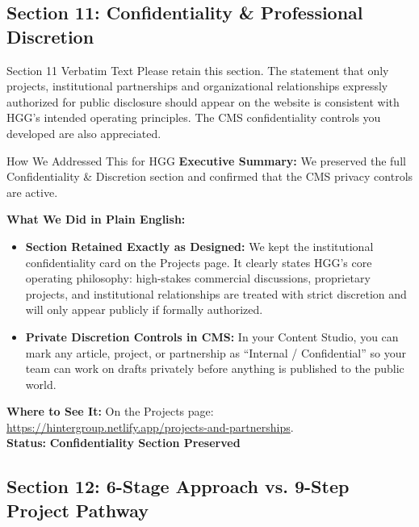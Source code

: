 \documentclass[11pt,a4paper]{article}
\begin{document}
\vspace{0.3cm}

\subsection{Section 11: Confidentiality \& Professional Discretion}

\begin{VerbatimClientBox}{Section 11 Verbatim Text}
Please retain this section.
The statement that only projects, institutional partnerships and organizational relationships expressly authorized for public disclosure should appear on the website is consistent with HGG's intended operating principles.
The CMS confidentiality controls you developed are also appreciated.
\end{VerbatimClientBox}

\begin{DetailedResolutionBox}{How We Addressed This for HGG}
\textbf{Executive Summary:} We preserved the full Confidentiality \& Discretion section and confirmed that the CMS privacy controls are active.

\textbf{What We Did in Plain English:}
\begin{itemize}
    \item \textbf{Section Retained Exactly as Designed:} We kept the institutional confidentiality card on the Projects page. It clearly states HGG's core operating philosophy: high-stakes commercial discussions, proprietary projects, and institutional relationships are treated with strict discretion and will only appear publicly if formally authorized.
    \item \textbf{Private Discretion Controls in CMS:} In your Content Studio, you can mark any article, project, or partnership as ``Internal / Confidential'' so your team can work on drafts privately before anything is published to the public world.
\end{itemize}

\textbf{Where to See It:} On the Projects page: \url{https://hintergroup.netlify.app/projects-and-partnerships}. \\
\textbf{Status:} \textcolor{HGGGreen}{\textbf{Confidentiality Section Preserved}}
\end{DetailedResolutionBox}

\vspace{0.3cm}

\subsection{Section 12: 6-Stage Approach vs. 9-Step Project Pathway}
\end{document}
